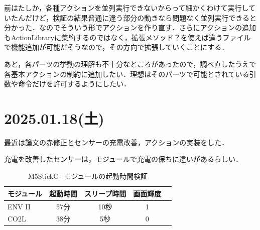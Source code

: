 \documentclass[fleqn,twocolumn]{mynote}
\begin{document}
  前はたしか，各種アクションを並列実行できないからって細かくわけて実行していたんだけど，検証の結果普通に違う部分の動きなら問題なく並列実行できると分かった．なのでそういう形でアクションを作り直す．さらにアクションの追加もActionLibraryに集約するのではなく，拡張メソッド？を使えば違うファイルで機能追加が可能だそうなので，その方向で拡張していくことにする．

  あと，各パーツの挙動の理解も不十分なところがあったので，調べ直したうえで各基本アクションの制約に追加したい．理想はそのパーツで可能とされている引数や命令だけを許可するようにしたい．

  \fboxsep=0pt            %
  \fboxrule=1pt            %
  \begin{figure}[h]
    \centering
    \caption{}
    \label{fig:}
  \end{figure}

  \section*{2025.01.18(土)}
  最近は論文の赤修正とセンサーの充電改善，アクションの実装をした．

  充電を改善したセンサーは，モジュールで充電の保ちに違いがあるらしい．

  \begin{table}[h]
    \caption{M5StickC+モジュールの起動時間検証}
    \label{tab:}
    \centering
    \begin{tabular}{|l|c|c||c|c|}
      \hline
      モジュール & 起動時間 & スリープ時間 & 画面輝度 \\
      \hline
      ENV II & 57分 & 10秒 & 1\\
      CO2L & 38分 & 5秒 & 0\\
      \hline
    \end{tabular}
  \end{table}
\end{document}
